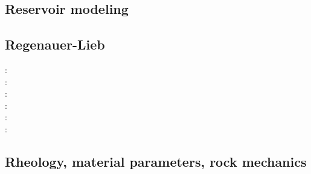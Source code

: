 \subsection{Reservoir modeling}

\begin{scriptsize}
\cite{orwa13}
\end{scriptsize}

\subsection{Regenauer-Lieb}

{\scriptsize
\twothousand: \cite{reyu00}\\
\twothousandthree: \cite{reyu03}\\
\twothousandfour: \cite{reyu04}\\
\twothousandsix: \cite{rehy06}\cite{rewr06}\\
\twothousandnine: \cite{reps09}\\
\twothousandthirteen: \cite{revp13}
}

\subsection{Rheology, material parameters, rock mechanics}

